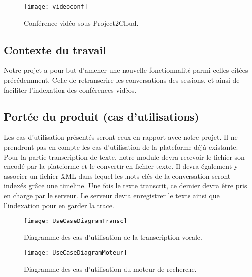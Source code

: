 \begin{figure}[H] 
				\begin{center}
					\texttt{[image: videoconf]}
					\caption{Conférence vidéo sous Project2Cloud.}			
				\end{center}
			\end{figure}

			\subsection{Contexte du travail}
			Notre projet a pour but d'amener une nouvelle fonctionnalité parmi celles citées précédemment. Celle de retranscrire les conversations des sessions, et ainsi de faciliter l'indexation des conférences vidéos. 

			
			
			\subsection{Portée du produit (cas d’utilisations)}
			Les cas d'utilisation présentés seront ceux en rapport avec notre projet. Il ne prendront pas en compte les cas d'utilisation de la plateforme déjà existante. Pour la partie transcription de texte, notre module devra recevoir le fichier son encodé par la plateforme et le convertir en fichier texte. Il devra également y associer un fichier XML dans lequel les mots clés de la conversation seront indexés grâce une timeline. Une fois le texte transcrit, ce dernier devra être pris en charge par le serveur. Le serveur devra enregistrer le texte ainsi que l'indexation pour en garder la trace. 

			\begin{figure}[H]
				\begin{center}
					\texttt{[image: UseCaseDiagramTransc]}
					\caption{Diagramme des cas d'utilisation de la transcription vocale.}			
				\end{center}
			\end{figure}

			\begin{figure}[H] 
				\begin{center}
					\texttt{[image: UseCaseDiagramMoteur]}
					\caption{Diagramme des cas d'utilisation du moteur de recherche.}			
				\end{center}
			\end{figure}

